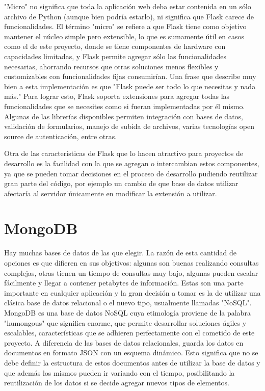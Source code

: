 "Micro" no significa que toda la aplicación web deba estar contenida en un sólo archivo de Python (aunque bien podría estarlo), ni significa que Flask carece de funcionalidades. El término "micro" se refiere a que Flask tiene como objetivo mantener el núcleo simple pero extensible, lo que es sumamente útil en casos como el de este proyecto, donde se tiene componentes de hardware con capacidades limitadas, y Flask permite agregar sólo las funcionalidades necesarias, ahorrando recursos que otras soluciones menos flexibles y customizables con funcionalidades fijas consumirían.
Una frase que describe muy bien a esta implementación es que "Flask puede ser todo lo que necesitas y nada más." 
Para lograr esto, Flask soporta extensiones para agregar todas las funcionalidades que se necesites como si fueran implementadas por él mismo. Algunas de las librerías disponibles permiten integración con bases de datos, validación de formularios, manejo de subida de archivos, varias tecnologías open source de autenticación, entre otras.

Otra de las características de Flask que lo hacen atractivo para proyectos de desarrollo es la facilidad con la que se agregan o intercambian estos componentes, ya que se pueden tomar decisiones en el proceso de desarrollo pudiendo reutilizar gran parte del código, por ejemplo un cambio de que base de datos utilizar afectaría al servidor únicamente en modificar la extensión a utilizar.

\section{MongoDB}
Hay muchas bases de datos de las que elegir. La razón de esta cantidad de opciones es que difieren en sus objetivos: algunas son buenas realizando consultas complejas, otras tienen un tiempo de consultas muy bajo, algunas pueden escalar fácilmente y llegar a contener petabytes de información.
Estas son una parte importante en cualquier aplicación y la gran decisión a tomar es la de utilizar una clásica base de datos relacional o el nuevo tipo, usualmente llamadas "NoSQL".
MongoDB es una base de datos NoSQL cuya etimología proviene de la palabra "humongous" que significa enorme, que permite desarrollar soluciones ágiles y escalables, características que se adhieren perfectamente con el cometido de este proyecto.
A diferencia de las bases de datos relacionales, guarda los datos en documentos en formato JSON con un esquema dinámico. 
Esto significa que no se debe definir la estructura de estos documentos antes de utilizar la base de datos y que además los mismos pueden ir variando con el tiempo, posibilitando la reutilización de los datos si se decide agregar nuevos tipos de elementos.


